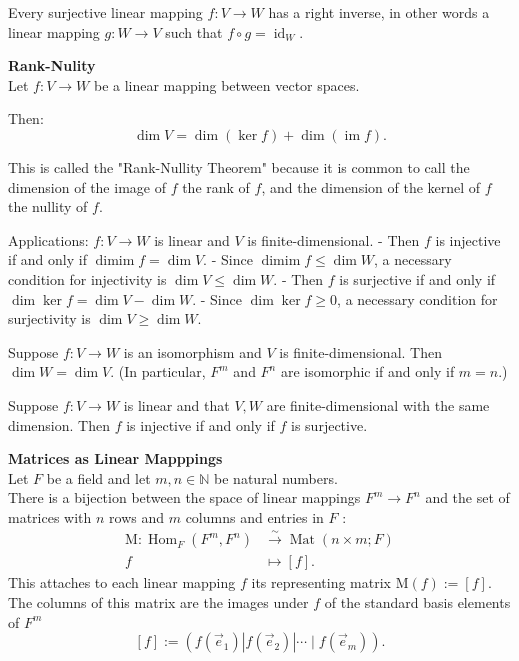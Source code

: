 \documentclass[a4paper, 10pt]{article}
\begin{document}
\begin{multicols*}{3}
Every surjective linear mapping $f: V \rightarrow W$ has a right inverse, in other words a linear mapping $g: W \rightarrow V$ such that $f \circ g=\operatorname{id}_W$.

\textbf{Rank-Nulity}\\
Let $f: V \rightarrow W$ be a linear mapping between vector spaces. 

Then:
$$
\operatorname{dim} V=\operatorname{dim}(\operatorname{ker} f)+\operatorname{dim}(\operatorname{im} f) .
$$

This is called the "Rank-Nullity Theorem" because it is common to call the dimension of the image of $f$ the rank of $f$, and the dimension of the kernel of $f$ the nullity of $f$.

Applications:
$f: V \rightarrow W$ is linear and $V$ is finite-dimensional. 
- Then $f$ is injective if and only if $\operatorname{dim im} f=\operatorname{dim} V$. 
    - Since $\operatorname{dim im} f \leq \operatorname{dim} W$, a necessary condition for injectivity is $\operatorname{dim} V \leq \operatorname{dim} W$.
- Then $f$ is surjective if and only if $\operatorname{dim} \operatorname{ker} f=\operatorname{dim} V-\operatorname{dim} W$.
    - Since $\operatorname{dim} \operatorname{ker} f \geq 0$, a necessary condition for surjectivity is $\operatorname{dim} V \geq \operatorname{dim} W$.

Suppose $f: V \rightarrow W$ is an isomorphism and $V$ is finite-dimensional. Then $\operatorname{dim} W=\operatorname{dim} V$. (In particular, $F^m$ and $F^n$ are isomorphic if and only if $m=n$.)

Suppose $f: V \rightarrow W$ is linear and that $V, W$ are finite-dimensional with the same dimension. Then $f$ is injective if and only if $f$ is surjective.

\textbf{Matrices as Linear Mapppings}\\
Let $F$ be a field and let $m, n \in \mathbb{N}$ be natural numbers. \\
There is a bijection between the space of linear mappings $F^m \rightarrow F^n$ and the set of matrices with $n$ rows and $m$ columns and entries in $F$ :\\
\begin{align*}
\mathrm{M}: \operatorname{Hom}_F\left(F^m, F^n\right) & \stackrel{\sim}{\rightarrow} \operatorname{Mat}(n \times m ; F) \\
f & \mapsto[f] .
\end{align*}
This attaches to each linear mapping $f$ its representing matrix $\mathrm{M}(f):=[f]$. \\
The columns of this matrix are the images under $f$ of the standard basis elements of $F^m$ \\
$$
[f]:=\left(f\left(\vec{e}_1\right)\left|f\left(\vec{e}_2\right)\right| \cdots \mid f\left(\vec{e}_m\right)\right) .
$$


\end{multicols*}
\end{document}
